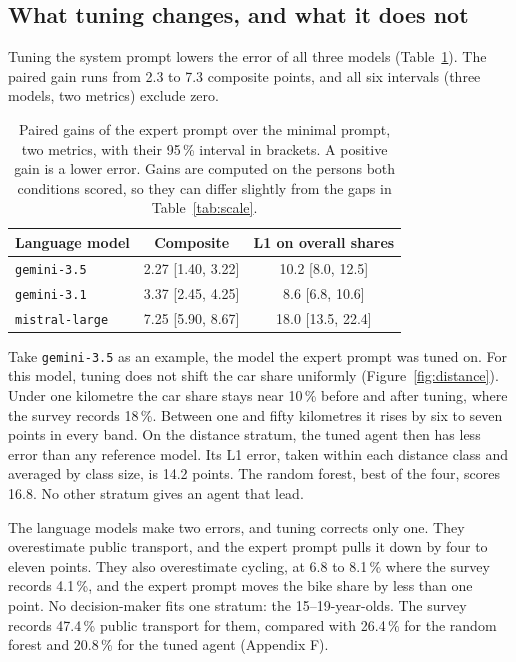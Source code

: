 \subsection{What tuning changes, and what it does not}
\label{sec:tuning}

Tuning the system prompt lowers the error of all three models (Table~\ref{tab:gains}).
The paired gain runs from 2.3 to 7.3 composite
points, and all six intervals (three models, two metrics) exclude zero.

\begin{table}[tp]
  \caption{Paired gains of the expert prompt over the minimal prompt, two metrics, with their 95\,\% interval in brackets. A positive gain is a lower error. Gains are computed on the persons both conditions scored, so they can differ slightly from the gaps in Table~\ref{tab:scale}.}
  \label{tab:gains}
  \begin{tabular}{lcc}
    \toprule
    Language model & Composite & L1 on overall shares \\
    \midrule
    \texttt{gemini-3.5}    & 2.27 [1.40, 3.22] & 10.2 [8.0, 12.5]  \\
    \texttt{gemini-3.1}    & 3.37 [2.45, 4.25] &  8.6 [6.8, 10.6]  \\
    \texttt{mistral-large} & 7.25 [5.90, 8.67] & 18.0 [13.5, 22.4] \\
    \bottomrule
  \end{tabular}
\end{table}

Take \texttt{gemini-3.5} as an example, the model the expert prompt was tuned on. For this
model, tuning does not shift the car share uniformly (Figure~\ref{fig:distance}). Under one
kilometre the car share stays near 10\,\% before and after tuning, where the survey records
18\,\%. Between one and fifty kilometres it rises by six to seven points in every band. On the
distance stratum, the tuned agent then has less error than any reference model. Its L1 error,
taken within each distance class and averaged by class size, is 14.2 points. The random
forest, best of the four, scores 16.8. No other stratum gives an agent that lead.

The language models make two errors, and tuning corrects only one. They overestimate public
transport, and the expert prompt pulls it down by four to eleven points. They also
overestimate cycling, at 6.8 to 8.1\,\% where the survey records 4.1\,\%, and the expert
prompt moves the bike share by less than one point. No decision-maker fits one stratum: the
15--19-year-olds. The survey records 47.4\,\% public transport for them, compared with
26.4\,\% for the random forest and 20.8\,\% for the tuned agent (Appendix F).

